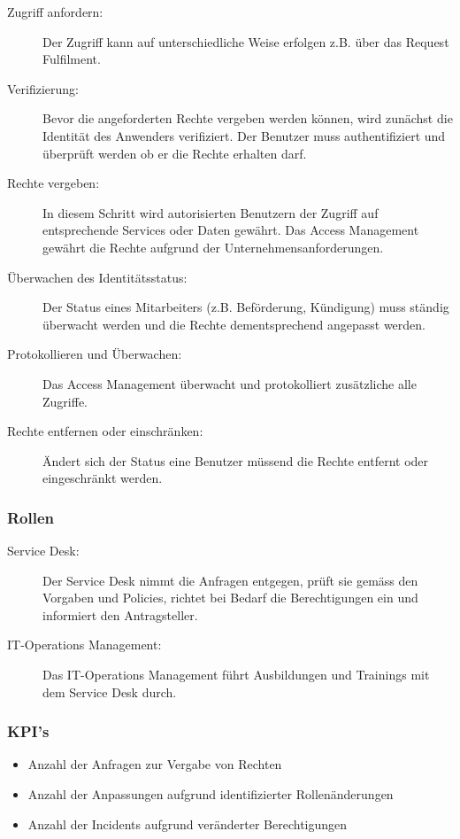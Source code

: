 \begin{description}
	\item[Zugriff anfordern:] Der Zugriff kann auf unterschiedliche Weise erfolgen z.B. über das Request Fulfilment.
	\item[Verifizierung:] Bevor die angeforderten Rechte vergeben werden können, wird zunächst die Identität des Anwenders verifiziert. Der Benutzer muss authentifiziert und überprüft werden ob er die Rechte erhalten darf.
	\item[Rechte vergeben:] In diesem Schritt wird autorisierten Benutzern der Zugriff auf entsprechende Services oder Daten gewährt. Das Access Management gewährt die Rechte aufgrund der Unternehmensanforderungen.
	\item[Überwachen des Identitätsstatus:] Der Status eines Mitarbeiters (z.B. Beförderung, Kündigung) muss ständig überwacht werden und die Rechte dementsprechend angepasst werden.
	\item[Protokollieren und Überwachen:] Das Access Management überwacht und protokolliert zusätzliche alle Zugriffe.
	\item[Rechte entfernen oder einschränken:] Ändert sich der Status eine Benutzer müssend die Rechte entfernt oder eingeschränkt werden.
\end{description}

\subsubsection{Rollen}

\begin{description}
	\item[Service Desk:] Der Service Desk nimmt die Anfragen entgegen, prüft sie gemäss den Vorgaben und Policies, richtet bei Bedarf die Berechtigungen ein und informiert den Antragsteller.
	\item[IT-Operations Management:] Das IT-Operations Management führt Ausbildungen und Trainings mit dem Service Desk durch.
\end{description}

\subsubsection{KPI's}

\begin{itemize}
	\item Anzahl der Anfragen zur Vergabe von Rechten
	\item Anzahl der Anpassungen aufgrund identifizierter Rollenänderungen
	\item Anzahl der Incidents aufgrund veränderter Berechtigungen
\end{itemize}
